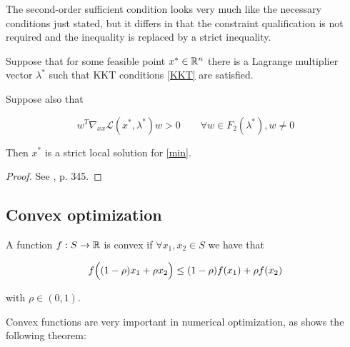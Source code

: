 The second-order sufficient condition looks very much like the necessary conditions just stated, but it differs in that the constraint qualification is not required and the inequality is replaced by a strict inequality.

\begin{theorem}
Suppose that for some feasible point $x^* \in \mathbb{R}^n$ there is a Lagrange multiplier vector $\lambda^*$ such that KKT conditions \eqref{KKT} are satisfied.

Suppose also that

$$ w^T \nabla_{xx} \mathcal{L}(x^*,\lambda^*) w > 0 \qquad \forall w \in F_2(\lambda^*), w \neq 0$$

Then $x^*$ is a strict local solution for \eqref{min}.

\begin{proof}
See \citep{nocedal}, p. 345.
\end{proof}
\end{theorem}

\subsection{Convex optimization} \label{app:convex}

\begin{defi}
A function $f: S \to \mathbb{R} $ is convex if $\forall x_1,x_2 \in S$ we have that

$$f\Bigl((1-\rho)x_1+\rho x_2\Bigr) \leq (1-\rho)f(x_1)+\rho f(x_2)$$

with $\rho \in (0,1)$.

\end{defi}

Convex functions are very important in numerical optimization, as shows the following theorem:

